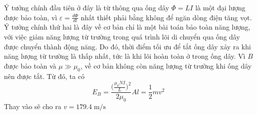 \begin{solution}
Ý tưởng chính đầu tiên ở đây là từ thông qua ống dây \( \Phi = LI \) là một đại lượng được bảo toàn, vì \( \varepsilon = \frac{d \Phi}{dt} \) nhất thiết phải bằng không để ngăn dòng điện tăng vọt. Ý tưởng chính thứ hai là đây về cơ bản chỉ là một bài toán bảo toàn năng lượng, với việc giảm năng lượng từ trường trong quá trình lõi di chuyển qua ống dây được chuyển thành động năng. Do đó, thời điểm tối ưu để tắt ống dây xảy ra khi năng lượng từ trường là thấp nhất, tức là khi lõi hoàn toàn ở trong ống dây.
\newline
\newline
Vì $B$ được bảo toàn và  $\mu \gg \mu_0$, về cơ bản không còn năng lượng từ trường khi ống dây nên được tắt.
Từ đó, ta có
$$E_B = \frac{\bigg (\frac{\mu_0 N I}{L}\bigg )^2}{2 \mu_0}Al = {\frac{1}{2}}mv^2$$
Thay vào sẽ cho ra $\boxed{v = 179.4 \;\mathrm{m/s}}$
\end{solution}
